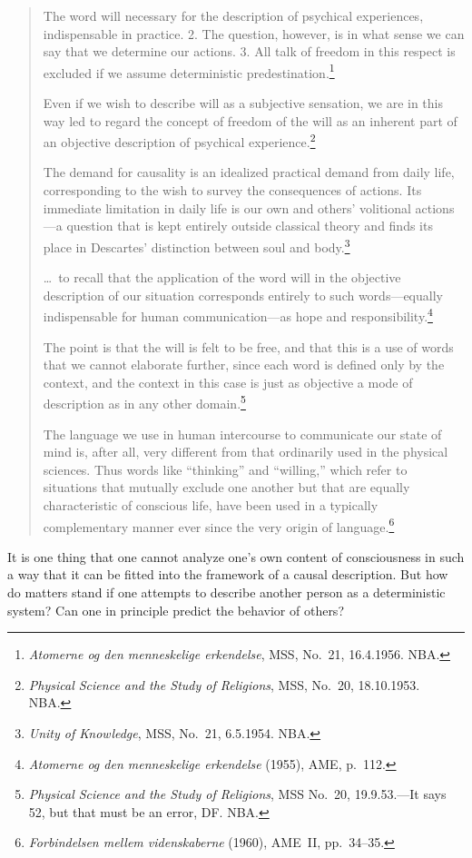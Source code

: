 \documentclass[12pt,a4paper]{book}
\begin{document}
\begin{quote}
The word will necessary for the description of psychical experiences, indispensable in practice. 2. The question, however, is in what sense we can say that we determine our actions. 3. All talk of freedom in this respect is excluded if we assume deterministic predestination.\footnote{\emph{Atomerne og den menneskelige erkendelse}, MSS, No.~21, 16.4.1956. NBA.}

Even if we wish to describe will as a subjective sensation, we are in this way led to regard the concept of freedom of the will as an inherent part of an objective description of psychical experience.\footnote{\emph{Physical Science and the Study of Religions}, MSS, No.~20, 18.10.1953. NBA.}

The demand for causality is an idealized practical demand from daily life, corresponding to the wish to survey the consequences of actions. Its immediate limitation in daily life is our own and others' volitional actions---a question that is kept entirely outside classical theory and finds its place in Descartes' distinction between soul and body.\footnote{\emph{Unity of Knowledge}, MSS, No.~21, 6.5.1954. NBA.}

\dots\ to recall that the application of the word will in the objective description of our situation corresponds entirely to such words---equally indispensable for human communication---as hope and responsibility.\footnote{\emph{Atomerne og den menneskelige erkendelse} (1955), AME, p.~112.}

The point is that the will is felt to be free, and that this is a use of words that we cannot elaborate further, since each word is defined only by the context, and the context in this case is just as objective a mode of description as in any other domain.\footnote{\emph{Physical Science and the Study of Religions}, MSS No.~20, 19.9.53.---It says 52, but that must be an error, DF. NBA.}

The language we use in human intercourse to communicate our state of mind is, after all, very different from that ordinarily used in the physical sciences. Thus words like ``thinking'' and ``willing,'' which refer to situations that mutually exclude one another but that are equally characteristic of conscious life, have been used in a typically complementary manner ever since the very origin of language.\footnote{\emph{Forbindelsen mellem videnskaberne} (1960), AME~II, pp.~34--35.}
\end{quote}

It is one thing that one cannot analyze one's own content of consciousness in such a way that it can be fitted into the framework of a causal description. But how do matters stand if one attempts to describe another person as a deterministic system? Can one in principle predict the behavior of others?
\end{document}
